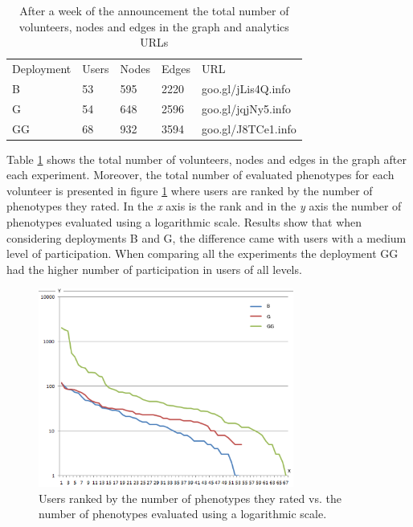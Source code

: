 \begin{table}
  \small
  \caption{ After a week of the announcement the total number of volunteers, 
  nodes and edges in the graph and analytics URLs}
  \label{tab:urls} 
  \centering
  \small
  \begin{tabular}{l l l l l}
    \hline\noalign{\smallskip}
     Deployment &  Users &  Nodes &  Edges & URL \\
    \noalign{\smallskip}\hline\noalign{\smallskip}
    B   & 53 &  595   & 2220  & goo.gl/jLis4Q.info \\ \hline
    G   & 54 &  648   & 2596  & goo.gl/jqjNy5.info \\ \hline
    GG  & 68 &  932   & 3594  & goo.gl/J8TCe1.info \\ \hline
    \end{tabular}
\end{table}

Table \ref{tab:urls} shows the total number of volunteers, nodes and edges 
in the graph after each experiment. Moreover, the total number of evaluated 
phenotypes for each volunteer is presented in figure 
\ref{fig:top-ranked-participation} where users are ranked by the 
number of phenotypes they rated. In the \emph{x} axis is the rank and in the \emph{y} axis 
the number of phenotypes evaluated using a logarithmic scale. Results show that when 
considering deployments B and G, the difference came with users with a medium level of participation.
When comparing all the experiments the deployment GG had the higher number of participation in users of all levels.    

\begin{figure}[!t]
    \centering
        \includegraphics[width=3.3in]{img/comparison.png}
    \caption{Users ranked by the number of phenotypes they rated vs. the number of phenotypes evaluated using a logarithmic scale. }
    \label{fig:top-ranked-participation}
\end{figure}

